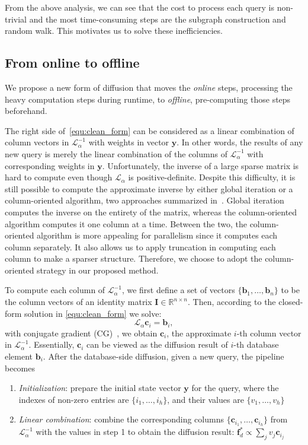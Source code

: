 \documentclass[letterpaper]{article} \usepackage{aaai19}  \usepackage{times}  \usepackage{helvet}  \usepackage{courier}  \usepackage{url}  \usepackage{graphicx}  \frenchspacing  \setlength{\pdfpagewidth}{8.5in}  \setlength{\pdfpageheight}{11in}
\begin{document}
From the above analysis, we can see that the cost to process each query is non-trivial and the most time-consuming steps are the subgraph construction and random walk.
This motivates us to solve these inefficiencies.


\subsection{From online to offline}
We propose a new form of diffusion that moves the \textit{online} steps, processing the heavy computation steps during runtime, to \textit{offline}, pre-computing those steps beforehand.

The right side of~\cref{equ:clean_form} can be considered as a linear combination of column vectors in $\mathcal{L}_\alpha^{-1}$ with weights in vector $\mathbf{y}$.
In other words, the results of any new query is merely the linear combination of the columns of $\mathcal{L}_\alpha^{-1}$ with corresponding weights in $\mathbf{y}$.
Unfortunately, the inverse of a large sparse matrix is hard to compute even though $\mathcal{L}_\alpha$ is positive-definite.
Despite this difficulty, it is still possible to compute the approximate inverse by either global iteration or a column-oriented algorithm, two approaches summarized in~\cite{saad2003iterative}.
Global iteration computes the inverse on the entirety of the matrix, whereas the column-oriented algorithm computes it one column at a time.
Between the two, the column-oriented algorithm is more appealing for parallelism since it computes each column separately.
It also allows us to apply truncation in computing each column to make a sparser structure.
Therefore, we choose to adopt the column-oriented strategy in our proposed method.

To compute each column of $\mathcal{L}_\alpha^{-1}$, we first define a set of vectors $\{\mathbf{b}_1,\dots,\mathbf{b}_n\}$ to be the column vectors of an identity matrix $\mathbf{I}\in\mathbb{R}^{n\times n}$.
Then, according to the closed-form solution in \cref{equ:clean_form} we solve:
\begin{equation}
\label{equ:offline_diffusion}
\mathcal{L}_\alpha \mathbf{c}_i = \mathbf{b}_i,
\end{equation}
 with conjugate gradient (CG)~\cite{nocedal2006numerical}, we obtain $\mathbf{c}_i$, the approximate $i$-th column vector in $\mathcal{L}_\alpha^{-1}$.
Essentially, $\mathbf{c}_i$ can be viewed as the diffusion result of $i$-th database element $\mathbf{b}_i$.
After the database-side diffusion, given a new query, the pipeline becomes
\begin{enumerate}
\item \textit{Initialization}: prepare the initial state vector $\mathbf{y}$ for the query, where the indexes of non-zero entries are $\{i_1, \dots, i_h\}$, and their values are $\{v_1, \dots, v_h\}$
\item \textit{Linear combination}: combine the corresponding columns $\{\mathbf{c}_{i_1}, \dots, \mathbf{c}_{i_h}\}$ from $\mathcal{L}_\alpha^{-1}$ with the values in step 1 to obtain the diffusion result: $\mathbf{f}_d^*\propto\sum_j{v_j \mathbf{c}_{i_j}}$
\end{enumerate}
\end{document}
